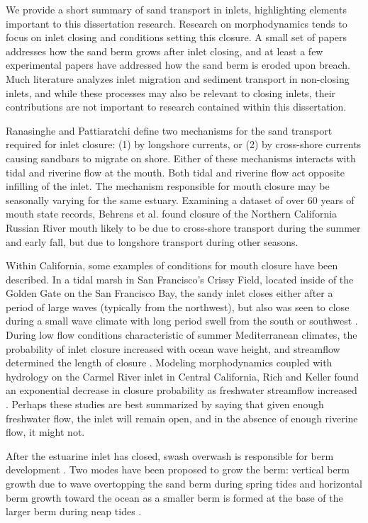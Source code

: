 We provide a short summary of sand transport in inlets, highlighting elements important to this dissertation research. Research on morphodynamics tends to focus on inlet closing and conditions setting this closure. A small set of papers addresses how the sand berm grows after inlet closing, and at least a few experimental papers have addressed how the sand berm is eroded upon breach. Much literature analyzes inlet migration and sediment transport in non-closing inlets, and while these processes may also be relevant to closing inlets, their contributions are not important to research contained within this dissertation.

Ranasinghe and Pattiaratchi \parencite*{ranasinghe_seasonal_2003} define two mechanisms for the sand transport required for inlet closure: (1) by longshore currents, or (2) by cross-shore currents causing sandbars to migrate on shore. Either of these mechanisms interacts  with tidal and riverine flow at the mouth. Both tidal and riverine flow act opposite infilling of the inlet. The mechanism responsible for mouth closure may be seasonally varying for the same estuary. Examining a dataset of over 60 years of mouth state records, Behrens et al. \parencite*{behrens_episodic_2013} found closure of the Northern California Russian River mouth likely to be due to cross-shore transport during the summer and early fall, but due to longshore transport during other seasons.

Within California, some examples of conditions for mouth closure have been described. In a tidal marsh in San Francisco's Crissy Field, located inside of the Golden Gate on the San Francisco Bay, the sandy inlet closes either after a period of large waves (typically from the northwest), but also was seen to close during a small wave climate with long period swell from the south or southwest \parencite{hanes_waves_2011}. During low flow conditions characteristic of summer Mediterranean climates, the probability of inlet closure increased with ocean wave height, and streamflow determined the length of closure \parencite{behrens_episodic_2013}. Modeling morphodynamics coupled with hydrology on the Carmel River inlet in Central California, Rich and Keller found an exponential decrease in closure probability as freshwater streamflow increased \parencite*{rich_hydrologic_2013}. Perhaps these studies are best summarized by saying that given enough freshwater flow, the inlet will remain open, and in the absence of enough riverine flow, it might not.

After the estuarine inlet has closed, swash overwash is responsible for berm development \parencite{baldock_morphodynamic_2008}. Two modes have been proposed to grow the berm: vertical berm growth due to wave overtopping the sand berm during spring tides and horizontal berm growth toward the ocean as a smaller berm is formed at the base of the larger berm during neap tides \parencite{weir_beach_2006}. 

